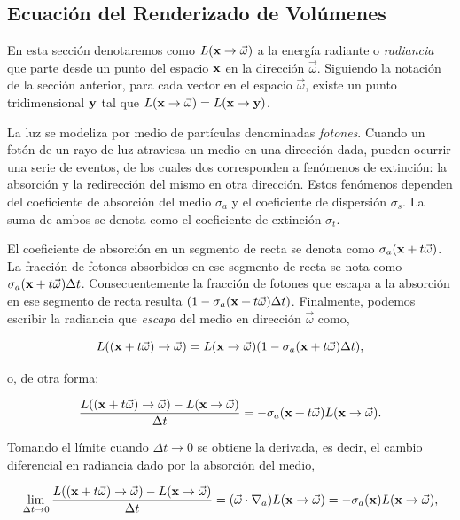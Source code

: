 \subsection{Ecuación del Renderizado de Volúmenes}

En esta sección denotaremos como $L(\bold{x} \rightarrow \vec{\omega})$ a la energía radiante o {\em radiancia} que parte desde un punto del espacio $\bold{x}$ en la dirección $\vec{\omega}$.
Siguiendo la notación de la sección anterior, para cada vector en el espacio $\vec{\omega}$, existe un punto tridimensional $\bold{y}$ tal que $L(\bold{x} \rightarrow \vec{\omega}) = L(\bold{x} \rightarrow \bold{y})$.

La luz se modeliza por medio de partículas denominadas {\em fotones}. Cuando un fotón de un rayo de luz atraviesa un medio en una dirección dada, pueden ocurrir una serie de eventos, de los cuales dos corresponden a fenómenos de extinción: la absorción y la redirección del mismo en otra dirección.
Estos fenómenos dependen del coeficiente de absorción del medio $\sigma_{a}$ y el coeficiente de dispersión $\sigma_{s}$.
La suma de ambos se denota como el coeficiente de extinción $\sigma_{t}$.

El coeficiente de absorción en un segmento de recta se denota como $\sigma_{a}(\bold{x} + t\vec{\omega})$.
La fracción de fotones absorbidos en ese segmento de recta se nota como $\sigma_{a}(\bold{x} + t\vec{\omega}) \Delta t$.
Consecuentemente la fracción de fotones que escapa a la absorción en ese segmento de recta resulta $(1-\sigma_{a}(\bold{x} + t\vec{\omega}) \Delta t)$.
Finalmente, podemos escribir la radiancia que {\em escapa} del medio en dirección $\vec{\omega}$ como,

$$L((\bold{x}+t\vec{\omega}) \rightarrow \vec{\omega}) = L(\bold{x} \rightarrow \vec{\omega}) (1-\sigma_{a}(\bold{x} + t\vec{\omega}) \Delta t),$$

o, de otra forma:

$$\frac{L((\bold{x}+t\vec{\omega}) \rightarrow \vec{\omega}) - L(\bold{x} \rightarrow \vec{\omega}) }{ \Delta t } = - \sigma_{a}(\bold{x} + t\vec{\omega}) L(\bold{x} \rightarrow \vec{\omega}).$$

Tomando el límite cuando $\Delta t \rightarrow 0$ se obtiene la derivada, es decir, el cambio diferencial en radiancia dado por la absorción del medio,

$$\lim_{\Delta t \rightarrow 0} \frac{L((\bold{x}+t\vec{\omega}) \rightarrow \vec{\omega}) - L(\bold{x} \rightarrow \vec{\omega}) }{ \Delta t } = (\vec{\omega} \cdot \nabla_{a}) L(\bold{x} \rightarrow \vec{\omega}) = - \sigma_{a}(\bold{x}) L(\bold{x} \rightarrow \vec{\omega}),$$

